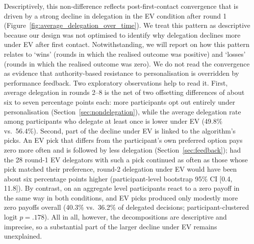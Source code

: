 \documentclass[a4paper, 12pt, fleqn]{article}
\theoremstyle{hypstyle}
\begin{document}
Descriptively, this non-difference reflects post-first-contact convergence that is driven by a strong decline in delegation in the EV condition after round 1 (Figure~\ref{fig:average_delegation_over_time}). We treat this pattern as descriptive because our design was not optimised to identify why delegation declines more under EV after first contact. Notwithstanding, we will report on how this pattern relates to `wins' (rounds in which the realised outcome was positive) and `losses' (rounds in which the realised outcome was zero). We do not read the convergence as evidence that authority-based resistance to personalisation is overridden by performance feedback. Two exploratory observations help to read it. First, average delegation in rounds 2--8 is the net of two offsetting differences of about six to seven percentage points each: more participants opt out entirely under personalisation (Section~\ref{sec:nondelegation}), while the average delegation rate among participants who delegate at least once is lower under EV (49.8\% vs.\ 56.4\%). Second, part of the decline under EV is linked to the algorithm's picks. An EV pick that differs from the participant's own preferred option pays zero more often and is followed by less delegation (Section~\ref{sec:feedback}); had the 28 round-1 EV delegators with such a pick continued as often as those whose pick matched their preference, round-2 delegation under EV would have been about six percentage points higher (participant-level bootstrap 95\% CI [0.4, 11.8]). By contrast, on an aggregate level participants react to a zero payoff in the same way in both conditions, and EV picks produced only modestly more zero payoffs overall (40.3\% vs.\ 36.2\% of delegated decisions; participant-clustered logit $p = .178$). All in all, however, the decompositions are descriptive and imprecise, so a substantial part of the larger decline under EV remains unexplained.
\end{document}
